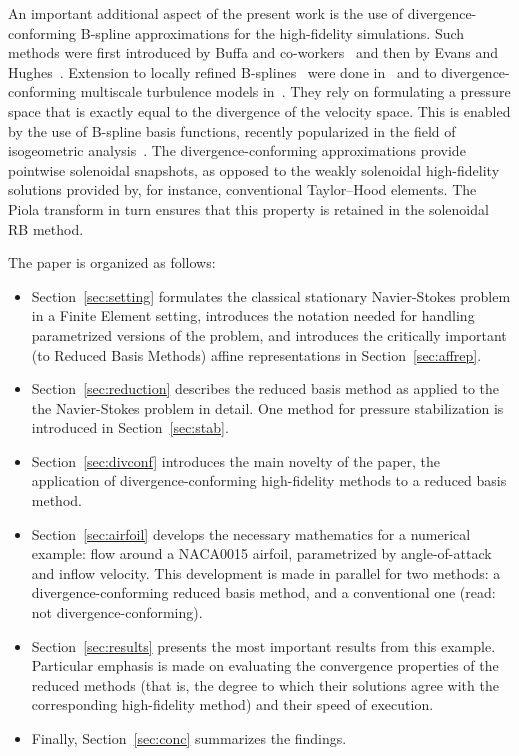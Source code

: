 \documentclass[onecolumn, twoside, a4paper, 11pt]{article}
\begin{document}
An important additional aspect of the present work is the use of divergence-conforming B-spline
approximations for the high-fidelity simulations.
Such methods were first introduced by Buffa and co-workers~\cite{Buffa2010iae,Buffa2011ias}
and then by Evans and Hughes~\cite{Evans2012dsa,Evans2013idc1,Evans2013idc2,Evans2013idc3}.
Extension to locally refined B-splines~\cite{Dokken2013psl,Johannessen2014ial}
were done in~\cite{Johannessen2015dcd} and to divergence-conforming multiscale turbulence
models in~\cite{Opstal2017idc}.
They rely on formulating a pressure space that
is exactly equal to the divergence of the velocity space. This is enabled by the use of
B-spline basis functions, recently popularized in the field of isogeometric
analysis~\cite{Cottrell2009iat}. The divergence-conforming approximations provide pointwise
solenoidal snapshots, as opposed to the weakly solenoidal high-fidelity solutions provided by, for
instance, conventional Taylor--Hood elements. The Piola transform in turn ensures that this property
is retained in the solenoidal RB method.

The paper is organized as follows:
\begin{itemize}
\item Section~\ref{sec:setting} formulates the classical stationary
  Navier-Stokes problem in a Finite Element setting, introduces the notation
  needed for handling parametrized versions of the problem, and introduces the
  critically important (to Reduced Basis Methods) affine representations in
  Section~\ref{sec:affrep}.
\item Section~\ref{sec:reduction} describes the reduced basis method as applied
  to the the Navier-Stokes problem in detail. One method for pressure
  stabilization is introduced in Section~\ref{sec:stab}.
\item Section~\ref{sec:divconf} introduces the main novelty of the paper, the
  application of divergence-conforming high-fidelity methods to a reduced basis
  method.
\item Section~\ref{sec:airfoil} develops the necessary mathematics for a
  numerical example: flow around a NACA0015 airfoil, parametrized by
  angle-of-attack and inflow velocity. This development is made in parallel for
  two methods: a divergence-conforming reduced basis method, and a conventional
  one (read: not divergence-conforming).
\item Section~\ref{sec:results} presents the most important results from this
  example. Particular emphasis is made on evaluating the convergence properties
  of the reduced methods (that is, the degree to which their solutions agree
  with the corresponding high-fidelity method) and their speed of execution.
\item Finally, Section~\ref{sec:conc} summarizes the findings.
\end{itemize}
\end{document}
